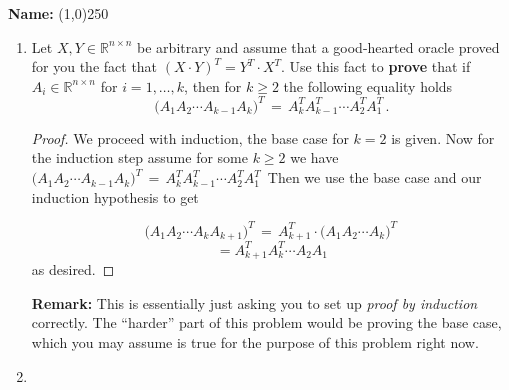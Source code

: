 \documentclass[11pt,table]{article}
\newcommand{\<}			{\langle}
\renewcommand{\>}      		{\rangle}
\def\Rnn{\mathbb{R}^{n\times n}}
\begin{document}
	\vspace*{9mm}
	
	\noindent
	{\bf Name:} \line(1,0){250}  \\
	
	\vspace*{8mm}


\vspace{5mm}


\newpage


\begin{enumerate}


\item Let $X, Y \in \Rnn$ be arbitrary and assume that a good-hearted oracle 
	proved for you  the fact that  
	$ (X \cdot Y ) ^T = Y^T \cdot X^T$. 
	Use this fact to {\bf prove} that if $A_i \in \mathbb{R}^{n \times n} $ for $i=1,\ldots, k$, 
	then for $k \geq 2$ the following equality holds 
	\begin{equation} \label{eqn-prob1}
	\Big(A_1A_2\cdots A_{k-1} A_k \Big)^T \, = \, A_k^TA_{k-1}^T \cdots A_2^T A_1^T \, .
	\end{equation} 

	
	\begin{proof}
		We proceed with induction, the base case for $k = 2$ is given. Now for the induction step assume for some 
		$k \geq 2$ we have $\Big(A_1A_2\cdots A_{k-1} A_k \Big)^T \, = \, A_k^TA_{k-1}^T \cdots A_2^T A_1^T \,$ 
		Then we use the base case and our induction hypothesis to get
		
			\[\Big(A_1A_2\cdots A_{k} A_{k+1} \Big)^T \, = \, A_{k+1}^T \cdot \Big(A_1A_2\cdots A_{k} \big)^T \, \]
			\[= A_{k+1}^TA_k^T \cdots A_2 A_1\]
		as desired. 

	\end{proof}

	
{\bf Remark:} 
This is essentially just asking you 
to set up {\em proof by induction} correctly. 
The ``harder'' part of this problem would be proving the base case, 
which you may assume is true for the purpose of this problem right now. 

\medskip
\item \quad {\, } 


\end{enumerate}
\end{document}
